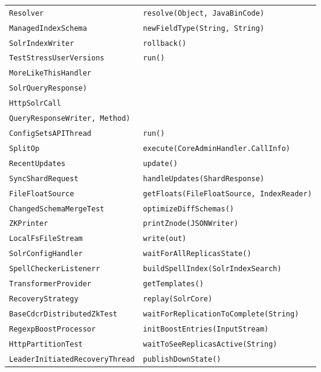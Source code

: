 \begin{center}
\begin{longtable}{ll}
\lstinline/Resolver/&{\lstinline/resolve(Object, JavaBinCode)/}\\
\lstinline/ManagedIndexSchema/&{\lstinline/newFieldType(String, String)/}\\
\lstinline/SolrIndexWriter/&{\lstinline/rollback()/}\\
\lstinline/TestStressUserVersions/&{\lstinline/run()/}\\
\lstinline/MoreLikeThisHandler/&\raisebox{-13pt}{\shortstack{\lstinline/handleRequestBody(SolrQueryRequest,/\\\lstinline/SolrQueryResponse)/}}\\
\lstinline/HttpSolrCall/&\raisebox{-13pt}{\shortstack{\lstinline/writeResponse(SolrQueryResponse,/\\\lstinline/QueryResponseWriter, Method)/}}\\
\lstinline/ConfigSetsAPIThread/&{\lstinline/run()/}\\
\lstinline/SplitOp/&{\lstinline/execute(CoreAdminHandler.CallInfo)/}\\
\lstinline/RecentUpdates/&{\lstinline/update()/}\\
\lstinline/SyncShardRequest/&{\lstinline/handleUpdates(ShardResponse)/}\\
\lstinline/FileFloatSource/&{\lstinline/getFloats(FileFloatSource, IndexReader)/}\\
\lstinline/ChangedSchemaMergeTest/&{\lstinline/optimizeDiffSchemas()/}\\
\lstinline/ZKPrinter/&{\lstinline/printZnode(JSONWriter)/}\\
\lstinline/LocalFsFileStream/&{\lstinline/write(out)/}\\
\lstinline/SolrConfigHandler/&{\lstinline/waitForAllReplicasState()/}\\
\lstinline/SpellCheckerListenerr/&{\lstinline/buildSpellIndex(SolrIndexSearch)/}\\
\lstinline/TransformerProvider/&{\lstinline/getTemplates()/}\\
\lstinline/RecoveryStrategy/&{\lstinline/replay(SolrCore)/}\\
\lstinline/BaseCdcrDistributedZkTest/&{\lstinline/waitForReplicationToComplete(String)/}\\
\lstinline/RegexpBoostProcessor/&{\lstinline/initBoostEntries(InputStream)/}\\
\lstinline/HttpPartitionTest/&{\lstinline/waitToSeeReplicasActive(String)/}\\
\lstinline/LeaderInitiatedRecoveryThread/&{\lstinline/publishDownState()/}\\

\end{longtable}
\end{center}
